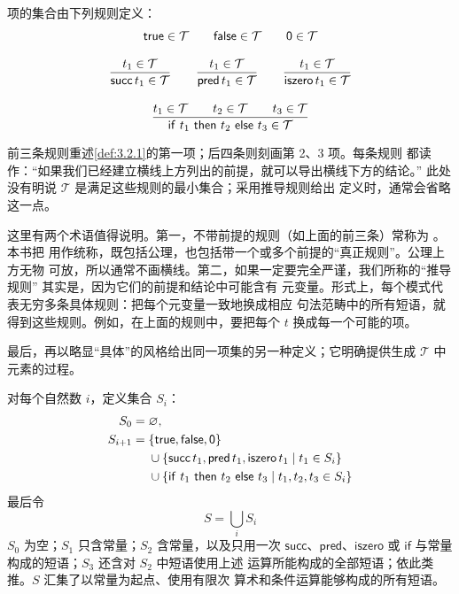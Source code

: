 \begin{definition}[项：由推导规则定义]
\label{def:3.2.2}
项的集合由下列规则定义：
\[
\begin{gathered}
 \mathsf{true}\in\mathcal{T}
 \qquad
 \mathsf{false}\in\mathcal{T}
 \qquad
 \mathsf{0}\in\mathcal{T}
 \\[8pt]
 \frac{t_1\in\mathcal{T}}{\mathsf{succ}\,t_1\in\mathcal{T}}
 \qquad
 \frac{t_1\in\mathcal{T}}{\mathsf{pred}\,t_1\in\mathcal{T}}
 \qquad
 \frac{t_1\in\mathcal{T}}{\mathsf{iszero}\,t_1\in\mathcal{T}}
 \\[10pt]
 \frac{t_1\in\mathcal{T}\qquad t_2\in\mathcal{T}\qquad
       t_3\in\mathcal{T}}
      {\mathsf{if}\ t_1\ \mathsf{then}\ t_2\ \mathsf{else}\ t_3\in\mathcal{T}}
\end{gathered}
\]
\end{definition}

前三条规则重述\cref{def:3.2.1}的第一项；后四条则刻画第 2、3 项。每条规则
都读作：“如果我们已经建立横线上方列出的前提，就可以导出横线下方的结论。”
此处没有明说 \(\mathcal{T}\) 是满足这些规则的最小集合；采用推导规则给出
定义时，通常会省略这一点。

这里有两个术语值得说明。第一，不带前提的规则（如上面的前三条）常称为
。本书把
用作统称，既包括公理，也包括带一个或多个前提的“真正规则”。公理上方无物
可放，所以通常不画横线。第二，如果一定要完全严谨，我们所称的“推导规则”
其实是，因为它们的前提和结论中可能含有
元变量。形式上，每个模式代表无穷多条具体规则：把每个元变量一致地换成相应
句法范畴中的所有短语，就得到这些规则。例如，在上面的规则中，要把每个
\(t\) 换成每一个可能的项。

最后，再以略显“具体”的风格给出同一项集的另一种定义；它明确提供生成
\(\mathcal{T}\) 中元素的过程。

\begin{definition}[项：具体定义]
\label{def:3.2.3}
对每个自然数 \(i\)，定义集合 \(S_i\)：
\[
\begin{aligned}
 S_0={}&\varnothing,\\
 S_{i+1}={}&\{\mathsf{true},\mathsf{false},\mathsf{0}\}\\
 &{}\cup\{\mathsf{succ}\,t_1,\mathsf{pred}\,t_1,\mathsf{iszero}\,t_1
          \mid t_1\in S_i\}\\
 &{}\cup\{\mathsf{if}\ t_1\ \mathsf{then}\ t_2\ \mathsf{else}\ t_3\mid t_1,t_2,t_3\in S_i\}
\end{aligned}
\]
最后令
\[
  S=\bigcup_i S_i
\]
\(S_0\) 为空；\(S_1\) 只含常量；\(S_2\) 含常量，以及只用一次
\(\mathsf{succ}\)、\(\mathsf{pred}\)、\(\mathsf{iszero}\) 或
\(\mathsf{if}\) 与常量构成的短语；\(S_3\) 还含对 \(S_2\) 中短语使用上述
运算所能构成的全部短语；依此类推。\(S\) 汇集了以常量为起点、使用有限次
算术和条件运算能够构成的所有短语。
\end{definition}

